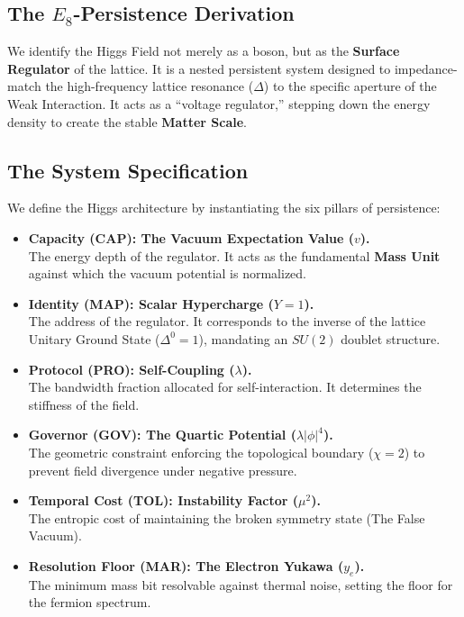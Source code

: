 \subsection{The \texorpdfstring{$E_8$}{E8}-Persistence Derivation}
We identify the Higgs Field not merely as a boson, but as the \textbf{Surface Regulator} of the lattice. It is a nested persistent system designed to impedance-match the high-frequency lattice resonance ($\Delta$) to the specific aperture of the Weak Interaction. It acts as a ``voltage regulator,'' stepping down the energy density to create the stable \textbf{Matter Scale}.

\subsection{The System Specification}
We define the Higgs architecture by instantiating the six pillars of persistence:

\begin{itemize}
    \item \textbf{Capacity (CAP): The Vacuum Expectation Value ($v$).} \\
    The energy depth of the regulator. It acts as the fundamental \textbf{Mass Unit} against which the vacuum potential is normalized.
    
    \item \textbf{Identity (MAP): Scalar Hypercharge ($Y=1$).} \\
    The address of the regulator. It corresponds to the inverse of the lattice Unitary Ground State ($\Delta^0=1$), mandating an $SU(2)$ doublet structure.
    
    \item \textbf{Protocol (PRO): Self-Coupling ($\lambda$).} \\
    The bandwidth fraction allocated for self-interaction. It determines the stiffness of the field.
    
    \item \textbf{Governor (GOV): The Quartic Potential ($\lambda|\phi|^4$).} \\
    The geometric constraint enforcing the topological boundary ($\chi=2$) to prevent field divergence under negative pressure.
    
    \item \textbf{Temporal Cost (TOL): Instability Factor ($\mu^2$).} \\
    The entropic cost of maintaining the broken symmetry state (The False Vacuum).
    
    \item \textbf{Resolution Floor (MAR): The Electron Yukawa ($y_e$).} \\
    The minimum mass bit resolvable against thermal noise, setting the floor for the fermion spectrum.
\end{itemize}


